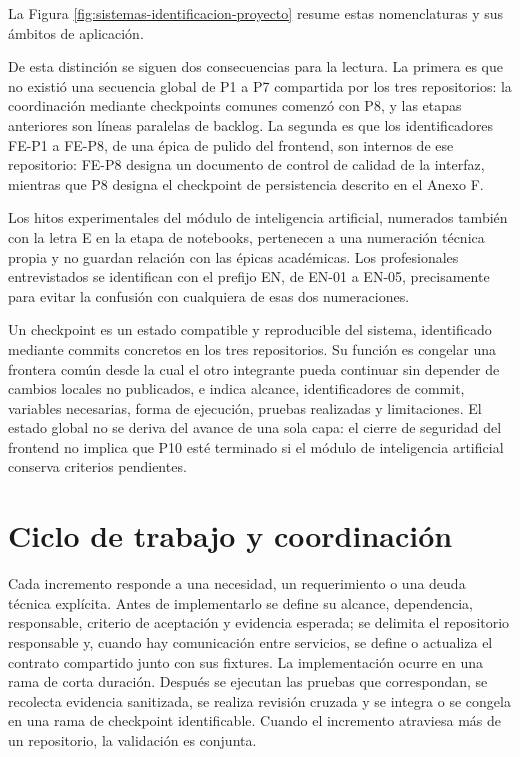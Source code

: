 La Figura \ref{fig:sistemas-identificacion-proyecto} resume estas nomenclaturas y sus ámbitos de aplicación.

De esta distinción se siguen dos consecuencias para la lectura. La primera es que no existió una secuencia global de P1 a P7 compartida por los tres repositorios: la coordinación mediante checkpoints comunes comenzó con P8, y las etapas anteriores son líneas paralelas de backlog. La segunda es que los identificadores FE-P1 a FE-P8, de una épica de pulido del frontend, son internos de ese repositorio: FE-P8 designa un documento de control de calidad de la interfaz, mientras que P8 designa el checkpoint de persistencia descrito en el Anexo F.

Los hitos experimentales del módulo de inteligencia artificial, numerados también con la letra E en la etapa de notebooks, pertenecen a una numeración técnica propia y no guardan relación con las épicas académicas. Los profesionales entrevistados se identifican con el prefijo EN, de EN-01 a EN-05, precisamente para evitar la confusión con cualquiera de esas dos numeraciones.

Un checkpoint es un estado compatible y reproducible del sistema, identificado mediante commits concretos en los tres repositorios. Su función es congelar una frontera común desde la cual el otro integrante pueda continuar sin depender de cambios locales no publicados, e indica alcance, identificadores de commit, variables necesarias, forma de ejecución, pruebas realizadas y limitaciones. El estado global no se deriva del avance de una sola capa: el cierre de seguridad del frontend no implica que P10 esté terminado si el módulo de inteligencia artificial conserva criterios pendientes.

\section{Ciclo de trabajo y coordinación}

Cada incremento responde a una necesidad, un requerimiento o una deuda técnica explícita. Antes de implementarlo se define su alcance, dependencia, responsable, criterio de aceptación y evidencia esperada; se delimita el repositorio responsable y, cuando hay comunicación entre servicios, se define o actualiza el contrato compartido junto con sus fixtures. La implementación ocurre en una rama de corta duración. Después se ejecutan las pruebas que correspondan, se recolecta evidencia sanitizada, se realiza revisión cruzada y se integra o se congela en una rama de checkpoint identificable. Cuando el incremento atraviesa más de un repositorio, la validación es conjunta.

